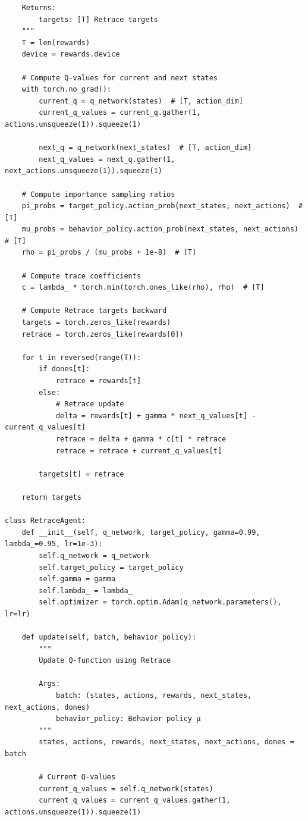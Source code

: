 \documentclass[12pt]{article}
\begin{document}
{{\begin{verbatim}
    Returns:
        targets: [T] Retrace targets
    """
    T = len(rewards)
    device = rewards.device
    
    # Compute Q-values for current and next states
    with torch.no_grad():
        current_q = q_network(states)  # [T, action_dim]
        current_q_values = current_q.gather(1, actions.unsqueeze(1)).squeeze(1)
        
        next_q = q_network(next_states)  # [T, action_dim]
        next_q_values = next_q.gather(1, next_actions.unsqueeze(1)).squeeze(1)
    
    # Compute importance sampling ratios
    pi_probs = target_policy.action_prob(next_states, next_actions)  # [T]
    mu_probs = behavior_policy.action_prob(next_states, next_actions)  # [T]
    rho = pi_probs / (mu_probs + 1e-8)  # [T]
    
    # Compute trace coefficients
    c = lambda_ * torch.min(torch.ones_like(rho), rho)  # [T]
    
    # Compute Retrace targets backward
    targets = torch.zeros_like(rewards)
    retrace = torch.zeros_like(rewards[0])
    
    for t in reversed(range(T)):
        if dones[t]:
            retrace = rewards[t]
        else:
            # Retrace update
            delta = rewards[t] + gamma * next_q_values[t] - current_q_values[t]
            retrace = delta + gamma * c[t] * retrace
            retrace = retrace + current_q_values[t]
        
        targets[t] = retrace
    
    return targets

class RetraceAgent:
    def __init__(self, q_network, target_policy, gamma=0.99, lambda_=0.95, lr=1e-3):
        self.q_network = q_network
        self.target_policy = target_policy
        self.gamma = gamma
        self.lambda_ = lambda_
        self.optimizer = torch.optim.Adam(q_network.parameters(), lr=lr)
    
    def update(self, batch, behavior_policy):
        """
        Update Q-function using Retrace
        
        Args:
            batch: (states, actions, rewards, next_states, next_actions, dones)
            behavior_policy: Behavior policy μ
        """
        states, actions, rewards, next_states, next_actions, dones = batch
        
        # Current Q-values
        current_q_values = self.q_network(states)
        current_q_values = current_q_values.gather(1, actions.unsqueeze(1)).squeeze(1)
        

\end{verbatim}}}
\end{document}
